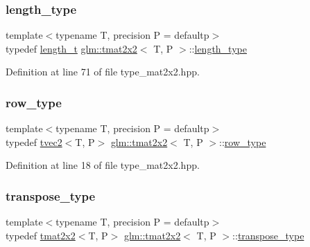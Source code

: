 \mbox{\label{structglm_1_1tmat2x2_a89bfd406715f8c3ae1c1f503d640fbb6}} 
\subsubsection{\texorpdfstring{length\_type}{length\_type}}
{\footnotesize\ttfamily template$<$typename T, precision P = defaultp$>$ \\
typedef \mbox{\hyperlink{namespaceglm_a090a0de2260835bee80e71a702492ed9}{length\+\_\+t}} \mbox{\hyperlink{structglm_1_1tmat2x2}{glm\+::tmat2x2}}$<$ T, P $>$\+::\mbox{\hyperlink{structglm_1_1tmat2x2_a89bfd406715f8c3ae1c1f503d640fbb6}{length\+\_\+type}}}



Definition at line 71 of file type\+\_\+mat2x2.\+hpp.

\mbox{\label{structglm_1_1tmat2x2_ae47fdac58575c6c061ef9af82d342367}} 
\subsubsection{\texorpdfstring{row\_type}{row\_type}}
{\footnotesize\ttfamily template$<$typename T, precision P = defaultp$>$ \\
typedef \mbox{\hyperlink{structglm_1_1tvec2}{tvec2}}$<$T, P$>$ \mbox{\hyperlink{structglm_1_1tmat2x2}{glm\+::tmat2x2}}$<$ T, P $>$\+::\mbox{\hyperlink{structglm_1_1tmat2x2_ae47fdac58575c6c061ef9af82d342367}{row\+\_\+type}}}



Definition at line 18 of file type\+\_\+mat2x2.\+hpp.

\mbox{\label{structglm_1_1tmat2x2_af3fafee9ef3082f4a2aa80cc25ce5b36}} 
\subsubsection{\texorpdfstring{transpose\_type}{transpose\_type}}
{\footnotesize\ttfamily template$<$typename T, precision P = defaultp$>$ \\
typedef \mbox{\hyperlink{structglm_1_1tmat2x2}{tmat2x2}}$<$T, P$>$ \mbox{\hyperlink{structglm_1_1tmat2x2}{glm\+::tmat2x2}}$<$ T, P $>$\+::\mbox{\hyperlink{structglm_1_1tmat2x2_af3fafee9ef3082f4a2aa80cc25ce5b36}{transpose\+\_\+type}}}



